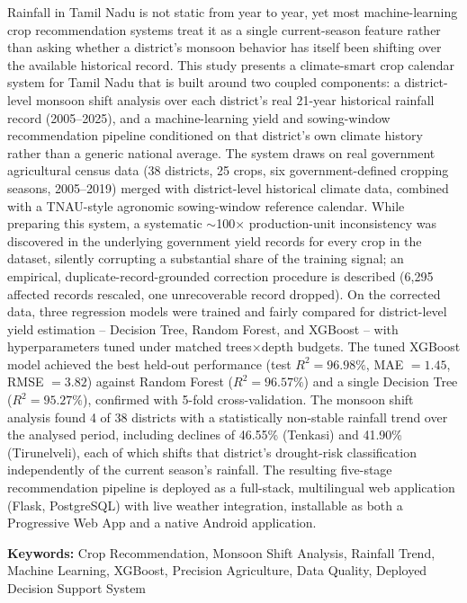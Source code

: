 \documentclass[12pt,a4paper,twocolumn]{article}
\begin{document}
\noindent Rainfall in Tamil Nadu is not static from year to year, yet most machine-learning
crop recommendation systems treat it as a single current-season feature rather than
asking whether a district's monsoon behavior has itself been shifting over the
available historical record. This study presents a climate-smart crop calendar
system for Tamil Nadu that is built around two coupled components: a district-level
monsoon shift analysis over each district's real 21-year historical rainfall record
(2005--2025), and a machine-learning yield and sowing-window recommendation pipeline
conditioned on that district's own climate history rather than a generic national
average. The system draws on real government agricultural census data (38 districts,
25 crops, six government-defined cropping seasons, 2005--2019) merged with
district-level historical climate data, combined with a TNAU-style agronomic
sowing-window reference calendar. While preparing this system, a systematic
$\sim$100$\times$ production-unit inconsistency was discovered in the underlying
government yield records for every crop in the dataset, silently corrupting a
substantial share of the training signal; an empirical, duplicate-record-grounded
correction procedure is described (6,295 affected records rescaled, one unrecoverable
record dropped). On the corrected data, three regression models were trained and
fairly compared for district-level yield estimation -- Decision Tree, Random Forest,
and XGBoost -- with hyperparameters tuned under matched trees$\times$depth budgets.
The tuned XGBoost model achieved the best held-out performance (test $R^2 = 96.98\%$,
MAE $= 1.45$, RMSE $= 3.82$) against Random Forest ($R^2 = 96.57\%$) and a single
Decision Tree ($R^2 = 95.27\%$), confirmed with 5-fold cross-validation. The monsoon
shift analysis found 4 of 38 districts with a statistically non-stable rainfall trend
over the analysed period, including declines of 46.55\% (Tenkasi) and 41.90\%
(Tirunelveli), each of which shifts that district's drought-risk classification
independently of the current season's rainfall. The resulting five-stage
recommendation pipeline is deployed as a full-stack, multilingual web application
(Flask, PostgreSQL) with live weather integration, installable as both a Progressive
Web App and a native Android application.

\vspace{6pt}
\noindent\textbf{Keywords:} Crop Recommendation, Monsoon Shift Analysis, Rainfall
Trend, Machine Learning, XGBoost, Precision Agriculture, Data Quality, Deployed
Decision Support System
\end{document}
